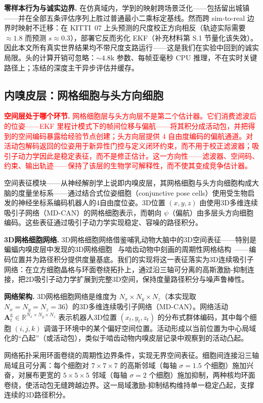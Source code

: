\textbf{零样本行为与诚实边界.} 在仿真域内，学到的映射跨场景泛化——包括留出城镇——并在全部五条评估序列上胜过普通最小二乘标定基线。然而跨 sim-to-real 边界时映射不迁移：在 KITTI~07 上头预测的尺度校正方向相反（轨迹实际需要 $\approx1.8$ 而预测 $s\approx0.3$），部署它反而劣化 EKF（补充材料第 S.1 节量化该失效）。因此本文所有真实世界结果均不带尺度支路运行——这是我们在实验中回到的诚实局限。头的计算开销可忽略：${\sim}4.8$k 参数、每帧亚毫秒 CPU 推理，不在实时关键路径上；冻结的深度主干异步评估并缓存。

\subsection{内嗅皮层：网格细胞与头方向细胞}

\textcolor{red}{\textbf{空间层处于哪个环节.} 网格细胞层与头方向层不是第二个估计器。它们消费滤波后的位姿——EKF 里程计模式下的帧间位移与偏航——将其积分成活动包，并把得到的空间编码暴露给经验节点创建；头方向层提供 4 自由度编码的偏航通道。对活动包解码返回的位姿用于新异性门控与定义闭环约束，而不用于校正滤波器；吸引子动力学因此是稳定表征，而不是修正估计。这一方向性——滤波器、空间码、约束、输出轨迹——保持了该层的生物学可解释性，而不使其变成竞争估计器。}

空间表征模块——从神经解剖学上说即内嗅皮层，其网格细胞与头方向细胞构成大脑的度量坐标系——通过结合式位姿细胞（conjunctive pose cells）使用受生物启发的神经坐标系编码机器人的4自由度位姿。3D位置 $(x, y, z)$ 由使用3D多维连续吸引子网络（MD-CAN）的网格细胞表示，而朝向 $\psi$（偏航）由多层头方向细胞编码。这些表征通过吸引子动力学实现稳定、容噪的路径积分。

\textbf{3D网格细胞网络.} 3D网格细胞网络借鉴哺乳动物大脑中的3D空间表征——特别是蝙蝠内嗅皮层中发现的3D网格细胞~\cite{finkelstein2016three} 与啮齿动物中刻画的周期性网格结构~\cite{hafting2005microstructure}——编码位置并为路径积分提供度量基底。我们的实现将这一表征落实为3D连续吸引子网络：在立方细胞晶格与环面卷绕拓扑上，通过沿三轴可分离的高斯激励-抑制连接，把2D吸引子动力学扩展到完整3D空间，保持度量路径积分与噪声鲁棒性。

\textbf{网络架构.} 3D网格细胞网络是维度为 $N_x \times N_y \times N_z$（本实现取 $N_x = N_y = N_z = 36$）的3D多维连续吸引子网络（MD-CAN）。网络活动 $\mathbf{A}^\mathrm{g}_t \in \mathbb{R}^{N_x \times N_y \times N_z}$ 表示机器人3D位置 $(x_t, y_t, z_t)$ 的分布式群体编码，其中每个细胞 $(i,j,k)$ 调谐于环境中的某个偏好空间位置。活动形成以当前位置为中心局域化的“凸起”（或活动包），类似于啮齿动物内嗅皮层记录中观察到的活动凸起。

网络拓扑采用环面卷绕的周期性边界条件，实现无界空间表征。细胞间连接沿三轴局域且可分离：每个细胞对 $7\times7\times7$ 的高斯邻域（每轴 $\sigma = 1.5$ 个细胞）施加兴奋，对展布更宽的 $5\times5\times5$ 邻域（每轴 $\sigma = 2$ 个细胞）施加抑制，两种核均环面卷绕，使活动包无缝跨越边界。这一局域激励-抑制结构维持单一稳定凸起，支撑连续的3D路径积分。

